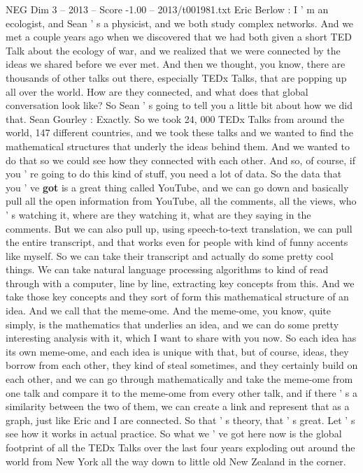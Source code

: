 \begin{textsample}{NEG Dim 3 – 2013 – Score -1.00 – 2013/t001981.txt}  \label{ex:f3_neg_033}
Eric Berlow : I ' m an ecologist, and Sean ' s a physicist, and we both study complex networks.
And we met a couple years ago when we discovered that we had both given a short TED Talk about the ecology of war, and we realized that we were connected by the ideas we shared before we ever met.
And then we thought, you know, there are thousands of other talks out there, especially TEDx Talks, that are popping up all over the world.
How are they connected, and what does that global conversation look like?
So Sean ' s going to tell you a little bit about how we did that.
Sean Gourley : Exactly.
So we took 24, 000 TEDx Talks from around the world, 147 different countries, and we took these talks and we wanted to find the mathematical structures that underly the ideas behind them.
And we wanted to do that so we could see how they connected with each other.
And so, of course, if you ' re going to do this kind of stuff, you need a lot of data.
So the data that you ' ve \textbf{got} is a great thing called YouTube, and we can go down and basically pull all the open information from YouTube, all the comments, all the views, who ' s watching it, where are they watching it, what are they saying in the comments.
But we can also pull up, using speech-to-text translation, we can pull the entire transcript, and that works even for people with kind of funny accents like myself.
So we can take their transcript and actually do some pretty cool things.
We can take natural language processing algorithms to kind of read through with a computer, line by line, extracting key concepts from this.
And we take those key concepts and they sort of form this mathematical structure of an idea.
And we call that the meme-ome.
And the meme-ome, you know, quite simply, is the mathematics that underlies an idea, and we can do some pretty interesting analysis with it, which I want to share with you now.
So each idea has its own meme-ome, and each idea is unique with that, but of course, ideas, they borrow from each other, they kind of steal sometimes, and they certainly build on each other, and we can go through mathematically and take the meme-ome from one talk and compare it to the meme-ome from every other talk, and if there ' s a similarity between the two of them, we can create a link and represent that as a graph, just like Eric and I are connected.
So that ' s theory, that ' s great.
Let ' s see how it works in actual practice.
So what we ' ve got here now is the global footprint of all the TEDx Talks over the last four years exploding out around the world from New York all the way down to little old New Zealand in the corner.

\end{textsample}
